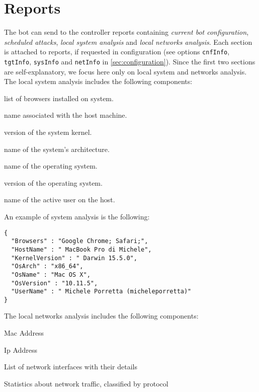 \section{Reports}
\label{sec:reports}

The bot can send to the controller reports containing \textit{current bot configuration}, \textit{scheduled attacks}, \textit{local system analysis} and \textit{local networks analysis}. Each section is attached to reports, if requested in configuration (see options \texttt{cnfInfo}, \texttt{tgtInfo}, \texttt{sysInfo} and \texttt{netInfo} in \ref{sec:configuration}). Since the first two sections are self-explanatory, we focus here only on local system and networks analysis.\\

The local system analysis includes the following components:
\begin{description}
  \setlength\itemsep{1em}
    \item [browsers] list of browsers installed on system.
	\item [hostName] name associated with the host machine.
	\item [kernelVersion] version of the system kernel.
	\item [osArch] name of the system's architecture.
  	\item [osName] name of the operating system.
  	\item [osVersion] version of the operating system.
  	\item [userName] name of the active user on the host.
\end{description}
\;

An example of system analysis is the following:
\begin{verbatim}
{
  "Browsers" : "Google Chrome; Safari;",
  "HostName" : " MacBook Pro di Michele",
  "KernelVersion" : " Darwin 15.5.0",
  "OsArch" : "x86_64",
  "OsName" : "Mac OS X",
  "OsVersion" : "10.11.5",
  "UserName" : " Michele Porretta (micheleporretta)"
}
\end{verbatim}

The local networks analysis includes the following components:

\begin{description}
  \setlength\itemsep{1em}
  \item [Mac] Mac Address
  \item [Ip] Ip Address 
  \item [CurrentNetworkInfo] List of network interfaces with their details
  \item [NetworkStatistics] Statistics about network traffic, classified by protocol
\end{description}
